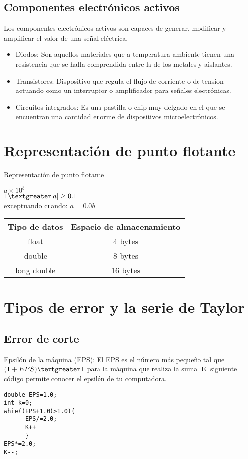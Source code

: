 \subsection{Componentes electr\'onicos activos}
Los componentes electr\'onicos activos son capaces de generar, modificar y amplificar el valor de una se\~nal el\'ectrica.

\begin{itemize}
\item Diodos: Son aquellos materiales que a temperatura ambiente tienen una resistencia que se halla comprendida entre la de los metales y aislantes.
\item Transistores: Dispositivo que regula el flujo de corriente o de tension actuando como un interruptor o amplificador para se\~nales electr\'onicas.
\item Circuitos integrados: Es una pastilla o chip muy delgado en el que se encuentran una cantidad enorme de dispositivos microelectr\'onicos.
\end{itemize}

\section{Representaci\'on de punto flotante}
Representaci\'on de punto flotante
\begin{center}
$a \times 10^b$\\
$1 \textgreater |a| \geq 0.1$\\
exceptuando cuando: $a=0.0b$ \\ 
\bigskip
\begin{tabular}{| c | c |}
\hline
Tipo de datos & Espacio de almacenamiento\\
\hline 
float& 4 bytes\\
double & 8 bytes\\
long double & 16 bytes\\
\hline
\end{tabular}
\end{center}

\section{Tipos de error y la serie de Taylor}
\subsection{Error de corte}
Epsil\'on de la m\'aquina (EPS): El EPS es el n\'umero m\'as pequeño tal que $(1+EPS)\textgreater1$ para la m\'aquina que realiza la suma.
El siguiente c\'odigo permite conocer el epsil\'on de tu computadora.
\medskip
\begin{verbatim}
double EPS=1.0;
int k=0;
whie((EPS+1.0)>1.0){
      EPS/=2.0;
      K++
      }
EPS*=2.0;
K--;
\end{verbatim}


